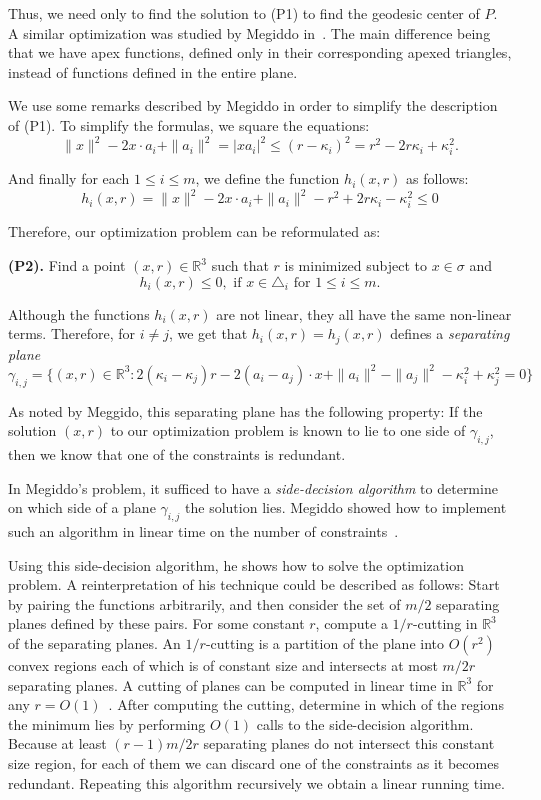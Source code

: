 \documentclass[a4paper,UKenglish]{lipics}
\newcommand{\cell}{\ensuremath{\sigma}}
\newcommand{\luis}[2][says]{}
\newcommand{\mati}[2][says]{}
\begin{document}
Thus, we need only to find the solution to (P1) to find the geodesic center of $P$.
A similar optimization was studied by Megiddo in~\cite{megiddo1989ball}. 
The main difference being that we have apex functions, defined only in their corresponding apexed triangles, instead of functions defined in the entire plane. 

We use some remarks described by Megiddo in order to simplify the description of (P1).
To simplify the formulas, we square the equations:
$$\|x\|^2 - 2x\cdot a_i + \|a_i\|^2  = |x a_i|^2 \leq (r - \kappa_i)^2 = r^2 - 2r\kappa_i + \kappa_i^2.$$ 
\mati{shouldnt the gi be squared in the above equation? and the $2x\cdot a_i$ be a minus in front?} \luis{Why a minus? it is the square of $|xa_i|$}
And finally for each $1\leq i\leq m$, we define the function $h_i(x, r)$ as follows:
$$h_i(x, r) = \|x\|^2 - 2x\cdot a_i + \|a_i\|^2  - r^2 + 2r\kappa_i - \kappa_i^2 \leq 0$$

Therefore, our optimization problem can be reformulated as:

\textbf{(P2).} Find a point $(x,r)\in \mathbb{R}^3$ such that $r$ is minimized subject to $x\in \cell$ and 
$$h_i(x, r) \leq 0, \text{ if $x\in \triangle_{i}$ for $1\leq i \leq m$}.$$%

Although the functions $h_i(x,r)$ are not linear, they all have the same non-linear terms. Therefore, for $i\neq j$, we get that
$h_i(x,r) = h_j(x, r)$ defines a \emph{separating plane}
$$\gamma_{i,j} = \{(x, r) \in \mathbb{R}^3:  2( \kappa_i - \kappa_j) r - 2 (a_i - a_j) \cdot x + \|a_i\|^2 - \|a_j\|^2 - \kappa_i^2 + \kappa_j^2 = 0\}$$

As noted by Meggido, this separating plane has the following property:
If the solution $(x, r)$ to our optimization problem is known to lie to one side of $\gamma_{i,j}$, then we know that one of the constraints is redundant. 

In Megiddo's problem, it sufficed to have a \emph{side-decision algorithm} to determine on which side of a plane $\gamma_{i,j}$ the solution lies. Megiddo showed how to implement such an algorithm in linear time on the number of constraints~\cite{megiddo1989ball}.

Using this side-decision algorithm, he shows how to solve the optimization problem. A reinterpretation of his technique could be described as follows: Start by pairing the functions arbitrarily, and then consider the set of $m/2$ separating planes defined by these pairs.
For some constant $r$, compute a $1/r$-cutting in $\mathbb{R}^3$ of the separating planes.
An $1/r$-cutting is a partition of the plane into $O(r^2)$ convex regions each of which is of constant size and intersects at most $m/2r$ separating planes.
A cutting of planes can be computed in linear time in $\mathbb{R}^3$ for any $r = O(1)$~\cite{matousekCuttings}.
After computing the cutting, determine in which of the regions the minimum lies by performing $O(1)$ calls to the side-decision algorithm. 
Because at least $(r-1)m/2r$ separating planes do not intersect this constant size region, for each of them we can discard one of the constraints as it becomes redundant. Repeating this algorithm recursively we obtain a linear running time.
\end{document}
